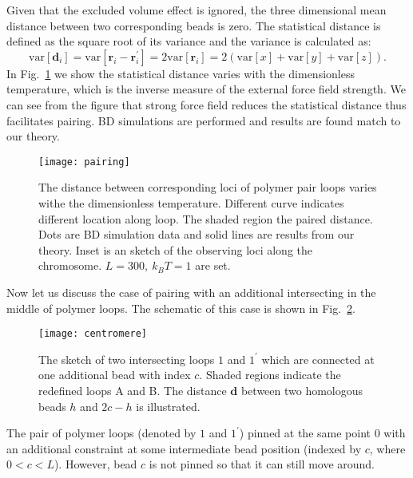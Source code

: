 Given that the excluded volume effect is ignored, the three dimensional mean distance between two corresponding beads is zero. The statistical distance is defined as the square root of its variance and the variance is calculated as:
\begin{equation}
    \label{eq:statisticalDistance}
    \text{var}\left[\mathbf{d}_i\right] = 
    \text{var}\left[\mathbf{r}_i - \mathbf{r}_i^\prime\right] = 2 \text{var}\left[\mathbf{r}_i\right]
    = 2\left( \text{var}\left[x\right] + \text{var}\left[y\right] + \text{var}\left[z\right]\right).
\end{equation}
In Fig.~\ref{fig:pairing} we show the statistical distance varies with the dimensionless temperature, which is the inverse measure of the external force field strength.
We can see from the figure that strong force field reduces the statistical distance thus facilitates pairing. BD simulations are performed and results are found match to our theory. 
\begin{figure}[htpb]
    \centering
    \texttt{[image: pairing]}
    \caption{The distance between corresponding loci of polymer pair loops varies withe the dimensionless temperature. Different curve indicates different location along loop. The shaded region the paired distance. Dots are BD simulation data and solid lines are results from our theory. Inset is an sketch of the observing loci along the chromosome. $L=300,~k_BT=1$ are set.}
    \label{fig:pairing}
\end{figure}

Now let us discuss the case of pairing with an additional intersecting in the middle of polymer loops. The schematic of this case is shown in Fig.~\ref{fig:centromere}.
\begin{figure}[htpb]
    \centering
    \texttt{[image: centromere]}
    \caption{The sketch of two intersecting loops $1$ and $1^\prime$ which are connected at one additional bead with index $c$. Shaded regions indicate the redefined loops A and B. The distance $\mathbf{d}$ between two homologous beads $h$ and $2c-h$ is illustrated. }
    \label{fig:centromere}
\end{figure}
The pair of polymer loops (denoted by $1$ and $1^\prime$) pinned at the same point $0$ with an additional constraint at some intermediate bead position (indexed by $c$, where $0<c<L$). However, bead $c$ is not pinned so that it can still move around. 

